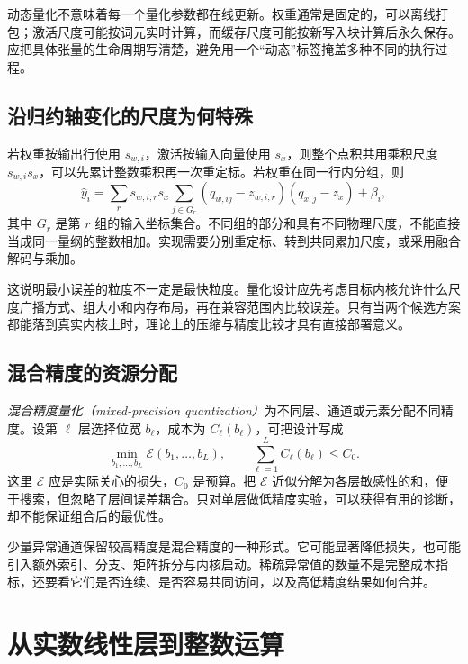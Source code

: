 \documentclass[UTF8,12pt,a4paper,fontset=fandol]{ctexart}
\begin{document}
动态量化不意味着每一个量化参数都在线更新。权重通常是固定的，可以离线打包；激活尺度可能按词元实时计算，而缓存尺度可能按新写入块计算后永久保存。应把具体张量的生命周期写清楚，避免用一个“动态”标签掩盖多种不同的执行过程。

\subsection{沿归约轴变化的尺度为何特殊}
若权重按输出行使用 $s_{w,i}$，激活按输入向量使用 $s_x$，则整个点积共用乘积尺度 $s_{w,i}s_x$，可以先累计整数乘积再一次重定标。若权重在同一行内分组，则
\begin{equation}
 \widehat y_i=\sum_r s_{w,i,r}s_x
 \sum_{j\in G_r}(q_{w,ij}-z_{w,i,r})(q_{x,j}-z_x)+\beta_i,
 \label{eq:quant-group-dot}
\end{equation}
其中 $G_r$ 是第 $r$ 组的输入坐标集合。不同组的部分和具有不同物理尺度，不能直接当成同一量纲的整数相加。实现需要分别重定标、转到共同累加尺度，或采用融合解码与乘加。

这说明最小误差的粒度不一定是最快粒度。量化设计应先考虑目标内核允许什么尺度广播方式、组大小和内存布局，再在兼容范围内比较误差。只有当两个候选方案都能落到真实内核上时，理论上的压缩与精度比较才具有直接部署意义。

\subsection{混合精度的资源分配}
\emph{混合精度量化（mixed-precision quantization）}为不同层、通道或元素分配不同精度。设第 $\ell$ 层选择位宽 $b_\ell$，成本为 $C_\ell(b_\ell)$，可把设计写成
\[
 \min_{b_1,\ldots,b_L}\mathcal E(b_1,\ldots,b_L),
 \qquad \sum_{\ell=1}^L C_\ell(b_\ell)\leq C_0.
\]
这里 $\mathcal E$ 应是实际关心的损失，$C_0$ 是预算。把 $\mathcal E$ 近似分解为各层敏感性的和，便于搜索，但忽略了层间误差耦合。只对单层做低精度实验，可以获得有用的诊断，却不能保证组合后的最优性。

少量异常通道保留较高精度是混合精度的一种形式。它可能显著降低损失，也可能引入额外索引、分支、矩阵拆分与内核启动。稀疏异常值的数量不是完整成本指标，还要看它们是否连续、是否容易共同访问，以及高低精度结果如何合并。

\section{从实数线性层到整数运算}
\label{sec:quant-integer}
\end{document}
